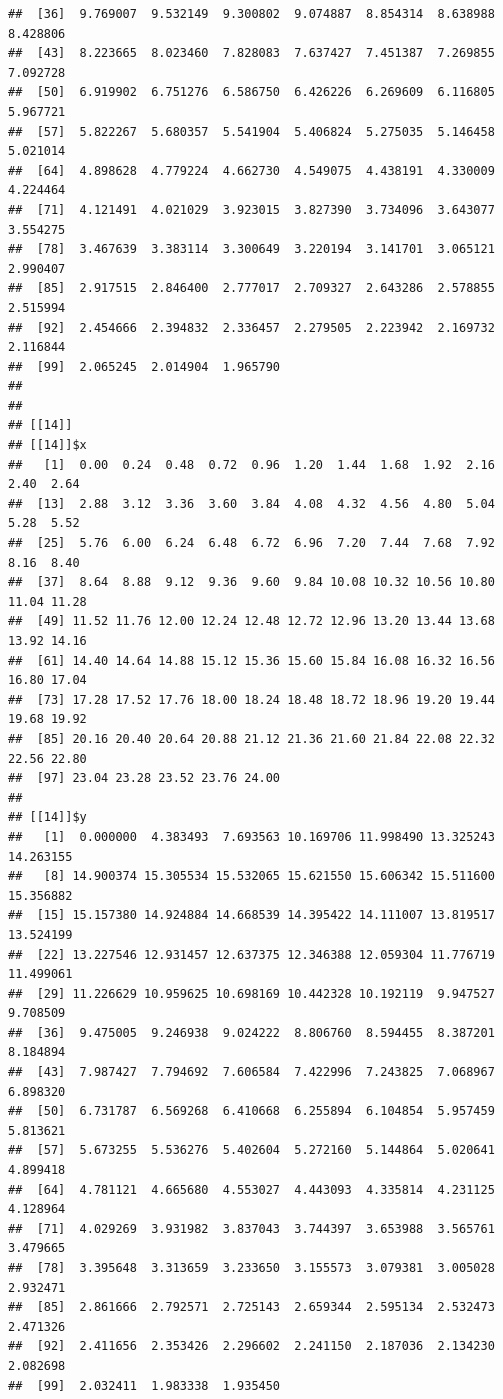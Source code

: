 \documentclass[
  ignorenonframetext,
]{beamer}
\begin{document}
\begin{frame}[fragile]{}
\begin{verbatim}
##  [36]  9.769007  9.532149  9.300802  9.074887  8.854314  8.638988  8.428806
##  [43]  8.223665  8.023460  7.828083  7.637427  7.451387  7.269855  7.092728
##  [50]  6.919902  6.751276  6.586750  6.426226  6.269609  6.116805  5.967721
##  [57]  5.822267  5.680357  5.541904  5.406824  5.275035  5.146458  5.021014
##  [64]  4.898628  4.779224  4.662730  4.549075  4.438191  4.330009  4.224464
##  [71]  4.121491  4.021029  3.923015  3.827390  3.734096  3.643077  3.554275
##  [78]  3.467639  3.383114  3.300649  3.220194  3.141701  3.065121  2.990407
##  [85]  2.917515  2.846400  2.777017  2.709327  2.643286  2.578855  2.515994
##  [92]  2.454666  2.394832  2.336457  2.279505  2.223942  2.169732  2.116844
##  [99]  2.065245  2.014904  1.965790
## 
## 
## [[14]]
## [[14]]$x
##   [1]  0.00  0.24  0.48  0.72  0.96  1.20  1.44  1.68  1.92  2.16  2.40  2.64
##  [13]  2.88  3.12  3.36  3.60  3.84  4.08  4.32  4.56  4.80  5.04  5.28  5.52
##  [25]  5.76  6.00  6.24  6.48  6.72  6.96  7.20  7.44  7.68  7.92  8.16  8.40
##  [37]  8.64  8.88  9.12  9.36  9.60  9.84 10.08 10.32 10.56 10.80 11.04 11.28
##  [49] 11.52 11.76 12.00 12.24 12.48 12.72 12.96 13.20 13.44 13.68 13.92 14.16
##  [61] 14.40 14.64 14.88 15.12 15.36 15.60 15.84 16.08 16.32 16.56 16.80 17.04
##  [73] 17.28 17.52 17.76 18.00 18.24 18.48 18.72 18.96 19.20 19.44 19.68 19.92
##  [85] 20.16 20.40 20.64 20.88 21.12 21.36 21.60 21.84 22.08 22.32 22.56 22.80
##  [97] 23.04 23.28 23.52 23.76 24.00
## 
## [[14]]$y
##   [1]  0.000000  4.383493  7.693563 10.169706 11.998490 13.325243 14.263155
##   [8] 14.900374 15.305534 15.532065 15.621550 15.606342 15.511600 15.356882
##  [15] 15.157380 14.924884 14.668539 14.395422 14.111007 13.819517 13.524199
##  [22] 13.227546 12.931457 12.637375 12.346388 12.059304 11.776719 11.499061
##  [29] 11.226629 10.959625 10.698169 10.442328 10.192119  9.947527  9.708509
##  [36]  9.475005  9.246938  9.024222  8.806760  8.594455  8.387201  8.184894
##  [43]  7.987427  7.794692  7.606584  7.422996  7.243825  7.068967  6.898320
##  [50]  6.731787  6.569268  6.410668  6.255894  6.104854  5.957459  5.813621
##  [57]  5.673255  5.536276  5.402604  5.272160  5.144864  5.020641  4.899418
##  [64]  4.781121  4.665680  4.553027  4.443093  4.335814  4.231125  4.128964
##  [71]  4.029269  3.931982  3.837043  3.744397  3.653988  3.565761  3.479665
##  [78]  3.395648  3.313659  3.233650  3.155573  3.079381  3.005028  2.932471
##  [85]  2.861666  2.792571  2.725143  2.659344  2.595134  2.532473  2.471326
##  [92]  2.411656  2.353426  2.296602  2.241150  2.187036  2.134230  2.082698
##  [99]  2.032411  1.983338  1.935450

\end{verbatim}
\end{frame}
\end{document}

